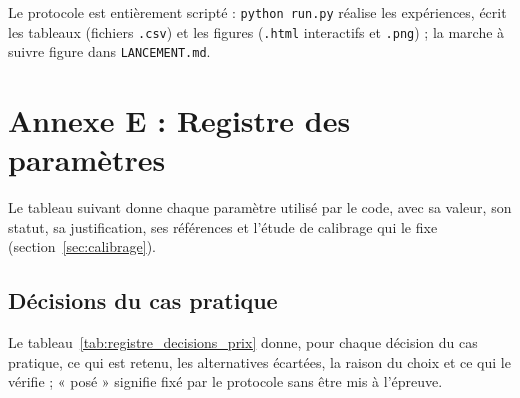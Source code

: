 Le protocole est entièrement scripté : \texttt{python run.py} réalise les expériences, écrit les tableaux (fichiers \texttt{.csv}) et les figures (\texttt{.html} interactifs et \texttt{.png}) ; la marche à suivre figure dans \texttt{LANCEMENT.md}.

\section*{Annexe E : Registre des paramètres}
Le tableau suivant donne chaque paramètre utilisé par le code, avec sa valeur, son statut, sa justification, ses références et l'étude de calibrage qui le fixe (section~\ref{sec:calibrage}).


\subsection*{Décisions du cas pratique}
Le tableau~\ref{tab:registre_decisions_prix} donne, pour chaque décision du cas pratique, ce qui est retenu, les alternatives écartées, la raison du choix et ce qui le vérifie ; « posé » signifie fixé par le protocole sans être mis à l'épreuve.

